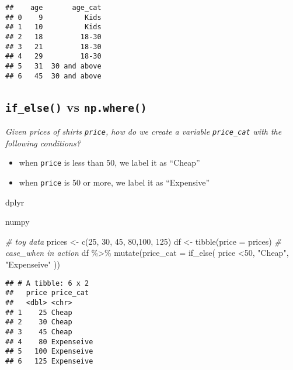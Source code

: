 \documentclass[
]{book}
\newenvironment{Shaded}{\begin{snugshade}}{\end{snugshade}}
\newcommand{\AttributeTok}[1]{\textcolor[rgb]{0.77,0.63,0.00}{#1}}
\newcommand{\CommentTok}[1]{\textcolor[rgb]{0.56,0.35,0.01}{\textit{#1}}}
\newcommand{\DecValTok}[1]{\textcolor[rgb]{0.00,0.00,0.81}{#1}}
\newcommand{\FunctionTok}[1]{\textcolor[rgb]{0.00,0.00,0.00}{#1}}
\newcommand{\NormalTok}[1]{#1}
\newcommand{\OtherTok}[1]{\textcolor[rgb]{0.56,0.35,0.01}{#1}}
\newcommand{\SpecialCharTok}[1]{\textcolor[rgb]{0.00,0.00,0.00}{#1}}
\newcommand{\StringTok}[1]{\textcolor[rgb]{0.31,0.60,0.02}{#1}}
\begin{document}
\begin{verbatim}
##    age       age_cat
## 0    9          Kids
## 1   10          Kids
## 2   18         18-30
## 3   21         18-30
## 4   29         18-30
## 5   31  30 and above
## 6   45  30 and above
\end{verbatim}

\hypertarget{if_else-vs-np.where}{%
\subsection{\texorpdfstring{\texttt{if\_else()} vs \texttt{np.where()}}{if\_else() vs np.where()}}\label{if_else-vs-np.where}}

\emph{Given prices of shirts \texttt{price}, how do we create a variable \texttt{price\_cat} with the following conditions?}

\begin{itemize}
\item
  when \texttt{price} is less than 50, we label it as ``Cheap''
\item
  when \texttt{price} is 50 or more, we label it as ``Expensive''
\end{itemize}

dplyr

numpy

\begin{Shaded}
\begin{Highlighting}[]
\CommentTok{\# toy data}
\NormalTok{prices }\OtherTok{\textless{}{-}} \FunctionTok{c}\NormalTok{(}\DecValTok{25}\NormalTok{, }\DecValTok{30}\NormalTok{, }\DecValTok{45}\NormalTok{, }\DecValTok{80}\NormalTok{,}\DecValTok{100}\NormalTok{, }\DecValTok{125}\NormalTok{)}
\NormalTok{df }\OtherTok{\textless{}{-}} \FunctionTok{tibble}\NormalTok{(}\AttributeTok{price =}\NormalTok{ prices)}
\CommentTok{\# case\_when in action}
\NormalTok{df }\SpecialCharTok{\%\textgreater{}\%} 
  \FunctionTok{mutate}\NormalTok{(}\AttributeTok{price\_cat =} \FunctionTok{if\_else}\NormalTok{(}
\NormalTok{    price }\SpecialCharTok{\textless{}}\DecValTok{50}\NormalTok{, }\StringTok{"Cheap"}\NormalTok{, }\StringTok{"Expenseive"}
\NormalTok{  ))}
\end{Highlighting}
\end{Shaded}

\begin{verbatim}
## # A tibble: 6 x 2
##   price price_cat 
##   <dbl> <chr>     
## 1    25 Cheap     
## 2    30 Cheap     
## 3    45 Cheap     
## 4    80 Expenseive
## 5   100 Expenseive
## 6   125 Expenseive
\end{verbatim}
\end{document}
